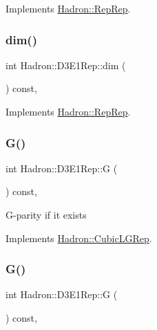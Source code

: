 Implements \mbox{\hyperlink{structHadron_1_1RepRep_a92c8802e5ed7afd7da43ccfd5b7cd92b}{Hadron\+::\+Rep\+Rep}}.

\mbox{\label{structHadron_1_1D3E1Rep_af48681bf92a948c02889dcaa4a44812b}} 
\subsubsection{\texorpdfstring{dim()}{dim()}\hspace{0.1cm}{\footnotesize\ttfamily [3/3]}}
{\footnotesize\ttfamily int Hadron\+::\+D3\+E1\+Rep\+::dim (\begin{DoxyParamCaption}{ }\end{DoxyParamCaption}) const\hspace{0.3cm}{\ttfamily [inline]}, {\ttfamily [virtual]}}



Implements \mbox{\hyperlink{structHadron_1_1RepRep_a92c8802e5ed7afd7da43ccfd5b7cd92b}{Hadron\+::\+Rep\+Rep}}.

\mbox{\label{structHadron_1_1D3E1Rep_ad12460a43ef8e0c2800f64e51c4274fc}} 
\subsubsection{\texorpdfstring{G()}{G()}\hspace{0.1cm}{\footnotesize\ttfamily [1/2]}}
{\footnotesize\ttfamily int Hadron\+::\+D3\+E1\+Rep\+::G (\begin{DoxyParamCaption}{ }\end{DoxyParamCaption}) const\hspace{0.3cm}{\ttfamily [inline]}, {\ttfamily [virtual]}}

G-\/parity if it exists 

Implements \mbox{\hyperlink{structHadron_1_1CubicLGRep_ace26f7b2d55e3a668a14cb9026da5231}{Hadron\+::\+Cubic\+L\+G\+Rep}}.

\mbox{\label{structHadron_1_1D3E1Rep_ad12460a43ef8e0c2800f64e51c4274fc}} 
\subsubsection{\texorpdfstring{G()}{G()}\hspace{0.1cm}{\footnotesize\ttfamily [2/2]}}
{\footnotesize\ttfamily int Hadron\+::\+D3\+E1\+Rep\+::G (\begin{DoxyParamCaption}{ }\end{DoxyParamCaption}) const\hspace{0.3cm}{\ttfamily [inline]}, {\ttfamily [virtual]}}

